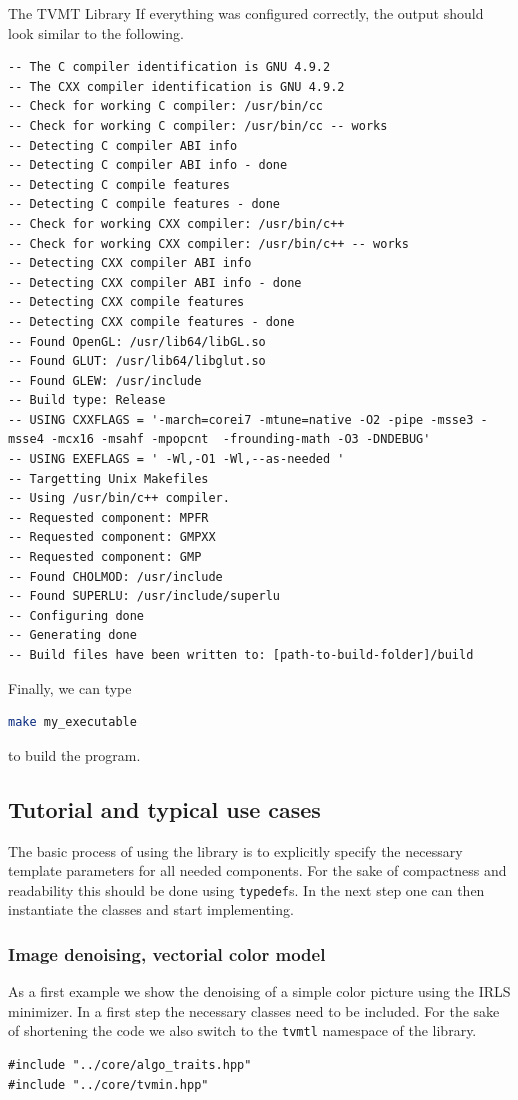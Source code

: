 \begin{chapter}{The TVMT Library}
If everything was configured correctly, the output should look similar to the following.\\
\begin{lstlisting}
-- The C compiler identification is GNU 4.9.2
-- The CXX compiler identification is GNU 4.9.2
-- Check for working C compiler: /usr/bin/cc
-- Check for working C compiler: /usr/bin/cc -- works
-- Detecting C compiler ABI info
-- Detecting C compiler ABI info - done
-- Detecting C compile features
-- Detecting C compile features - done
-- Check for working CXX compiler: /usr/bin/c++
-- Check for working CXX compiler: /usr/bin/c++ -- works
-- Detecting CXX compiler ABI info
-- Detecting CXX compiler ABI info - done
-- Detecting CXX compile features
-- Detecting CXX compile features - done
-- Found OpenGL: /usr/lib64/libGL.so  
-- Found GLUT: /usr/lib64/libglut.so  
-- Found GLEW: /usr/include  
-- Build type: Release
-- USING CXXFLAGS = '-march=corei7 -mtune=native -O2 -pipe -msse3 -msse4 -mcx16 -msahf -mpopcnt  -frounding-math -O3 -DNDEBUG'
-- USING EXEFLAGS = ' -Wl,-O1 -Wl,--as-needed '
-- Targetting Unix Makefiles
-- Using /usr/bin/c++ compiler.
-- Requested component: MPFR
-- Requested component: GMPXX
-- Requested component: GMP
-- Found CHOLMOD: /usr/include  
-- Found SUPERLU: /usr/include/superlu  
-- Configuring done
-- Generating done
-- Build files have been written to: [path-to-build-folder]/build
\end{lstlisting}

Finally, we can type
\begin{lstlisting}[language=bash]
make my_executable
\end{lstlisting}
to build the program.


\subsection{Tutorial and typical use cases} %
\label{sub:Tutorial and typical use cases}
The basic process of using the library is to explicitly specify the necessary template parameters for all needed components. 
For the sake of compactness and readability this should be done using \texttt{typedef}s. In the next step one can then
instantiate the classes and start implementing.\\

\subsubsection{Image denoising, vectorial color model} %
\label{ssub:Image denoising, vectorial color model}
As a first example we show the denoising of a simple color picture using the IRLS minimizer. In a first step the necessary classes need to be included. For the sake of shortening the 
code we also switch to the \texttt{tvmtl} namespace of the library. \\
\cppinline
\begin{lstlisting}[label=code:tut_include,caption={Inclusion of library headers}]
#include "../core/algo_traits.hpp"
#include "../core/tvmin.hpp"


\end{lstlisting}
\end{chapter}
